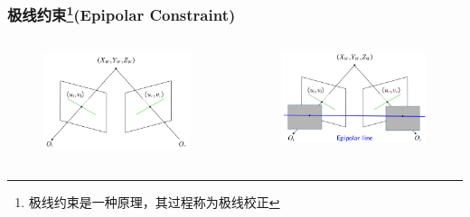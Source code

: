 \documentclass[aspectratio=43]{beamer}
\begin{document}
		
		\begin{frame}
		\frametitle{极线约束\footnote{极线约束是一种原理，其过程称为极线校正}(Epipolar Constraint)}
		
		\begin{columns}
		\column{5cm}

		\begin{figure}
			\includegraphics[scale=0.5]{双目相机-极线约束1}
		\end{figure}
		\column{6cm}

		\begin{figure}
			\includegraphics[scale=0.5]{双目相机-极线约束2}
		\end{figure}
		\end{columns}	
		\end{frame}
	
\end{document}
